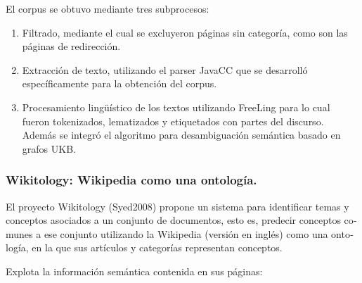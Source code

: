 \documentclass[letterpaper]{article}
\newcommand\textstylebibuscitbase[1]{#1}
\newcommand\liststyleLxvii{%
\renewcommand\theenumi{\arabic{enumi}}
\renewcommand\theenumii{\arabic{enumii}}
\renewcommand\theenumiii{\arabic{enumiii}}
\renewcommand\theenumiv{\arabic{enumiv}}
\renewcommand\labelenumi{\theenumi.}
\renewcommand\labelenumii{\theenumii.}
\renewcommand\labelenumiii{\theenumiii.}
\renewcommand\labelenumiv{\theenumiv.}
}
\begin{document}
\bigskip

{\sffamily
\textstylebibuscitbase{El corpus se obtuvo mediante tres subprocesos:}}


\bigskip

\liststyleLxvii
\begin{enumerate}
\item {\sffamily
\textstylebibuscitbase{Filtrado, mediante el cual se excluyeron
p\'aginas sin categor\'ia, como son las p\'aginas de redirecci\'on.}}
\item {\sffamily
\textstylebibuscitbase{Extracci\'on de texto, utilizando el parser
JavaCC que se desarroll\'o espec\'ificamente para la obtenci\'on del
corpus.}}
\item {\sffamily
\textstylebibuscitbase{Procesamiento ling\"u\'istico de los textos
utilizando FreeLing para lo cual fueron tokenizados, lematizados y
etiquetados con }\textstylebibuscitbase{partes del
discurso}\textstylebibuscitbase{. }\textstylebibuscitbase{Adem\'as se
integr\'o el algoritmo para desambiguaci\'on sem\'antica basado en
grafos UKB.}}
\end{enumerate}

\bigskip

\subsubsection[Wikitology: Wikipedia como una ontolog\'ia.]{Wikitology:
Wikipedia como una ontolog\'ia.}
\hypertarget{RefHeading10798782078703}{}
\bigskip

{\sffamily
\textstylebibuscitbase{\foreignlanguage{spanish}{El proyecto Wikitology
}}\textstylebibuscitbase{\foreignlanguage{spanish}{(Syed2008)}}\textstylebibuscitbase{\foreignlanguage{spanish}{
propone un sistema para identificar temas y conceptos asociados a un
conjunto de documentos, esto es, predecir conceptos comunes a ese
conjunto utilizando la Wikipedia (versi\'on en ingl\'es) como una
ontolog\'ia, en la que sus art\'iculos y categor\'ias representan
conceptos.}}}


\bigskip

{\sffamily
\textstylebibuscitbase{\foreignlanguage{spanish}{Explota la
informaci\'on sem\'antica contenida en sus p\'aginas:}}}


\bigskip
\end{document}
